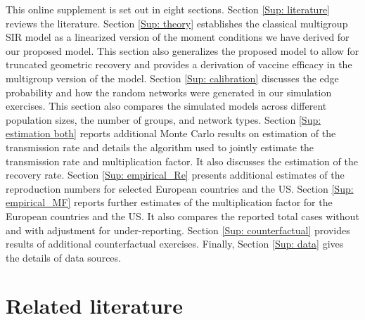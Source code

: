 \documentclass[12pt]{article}
\begin{document}
This online supplement is set out in eight sections. Section
\ref{Sup: literature} reviews the literature. Section \ref{Sup: theory}
establishes the classical multigroup SIR model as a linearized version of the
moment conditions we have derived for our proposed model. This section also
generalizes the proposed model to allow for truncated geometric recovery and
provides a derivation of vaccine efficacy in the multigroup version of the
model. Section \ref{Sup: calibration} discusses the edge probability and how
the random networks were generated in our simulation exercises. This section
also compares the simulated models across different population sizes, the
number of groups, and network types. Section \ref{Sup: estimation both}
reports additional Monte Carlo results on estimation of the transmission rate
and details the algorithm used to jointly estimate the transmission rate and
multiplication factor. It also discusses the estimation of the recovery rate.
Section \ref{Sup: empirical_Re} presents additional estimates of the
reproduction numbers for selected European countries and the US. Section
\ref{Sup: empirical_MF} reports further estimates of the multiplication factor
for the European countries and the US. It also compares the reported total
cases without and with adjustment for under-reporting. Section
\ref{Sup: counterfactual} provides results of additional counterfactual
exercises. Finally, Section \ref{Sup: data} gives the details of data sources.

\section{Related literature \label{Sup: literature}}
\end{document}
